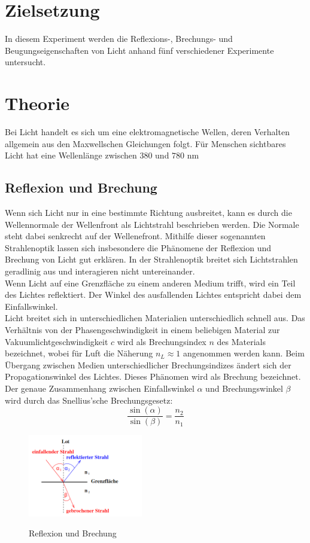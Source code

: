 \section{Zielsetzung}
In diesem Experiment werden die Reflexions-, Brechungs- und Beugungseigenschaften von Licht anhand fünf verschiedener Experimente untersucht.
\section{Theorie}
Bei Licht handelt es sich um eine elektromagnetische Wellen, deren Verhalten allgemein aus den Maxwellschen Gleichungen folgt. Für Menschen sichtbares Licht hat eine Wellenlänge zwischen $380$ und $780$ nm
\subsection{Reflexion und Brechung}
Wenn sich Licht nur in eine bestimmte Richtung ausbreitet, kann es durch die Wellennormale der Wellenfront als Lichtstrahl beschrieben werden. Die Normale steht dabei senkrecht auf der Wellenefront. Mithilfe dieser sogenannten Strahlenoptik lassen sich insbesondere die Phänomene der Reflexion und Brechung von Licht gut erklären. In der Strahlenoptik breitet sich Lichtstrahlen geradlinig aus und interagieren nicht untereinander. \\
Wenn Licht auf eine Grenzfläche zu einem anderen Medium trifft, wird ein Teil des Lichtes reflektiert. Der Winkel des ausfallenden Lichtes entspricht dabei dem Einfallswinkel. \\
Licht breitet sich in unterschiedlichen Materialien unterschiedlich schnell aus. Das Verhältnis von der Phasengeschwindigkeit in einem beliebigen Material zur Vakuumlichtgeschwindigkeit $c$ wird als Brechungsindex $n$ des Materials bezeichnet, wobei für Luft die Näherung $n_L \approx 1$ angenommen werden kann. Beim Übergang zwischen Medien unterschiedlicher Brechungsindizes ändert sich der Propagationswinkel des Lichtes. Dieses Phänomen wird als Brechung bezeichnet. Der genaue Zusammenhang zwischen Einfallswinkel $\alpha$ und Brechungswinkel $\beta$ wird durch das Snellius'sche Brechungsgesetz:
\begin{equation}
\frac{\sin(\alpha)}{\sin(\beta)}=\frac{n_2}{n_1}
\end{equation}
\begin{figure} [h]
    \centering
    \includegraphics[width=5cm, keepaspectratio]{Reflexion und Brechung}
    \label{fig:Reflexion und Brechung}
    \caption{Reflexion und Brechung}
 \end{figure}
